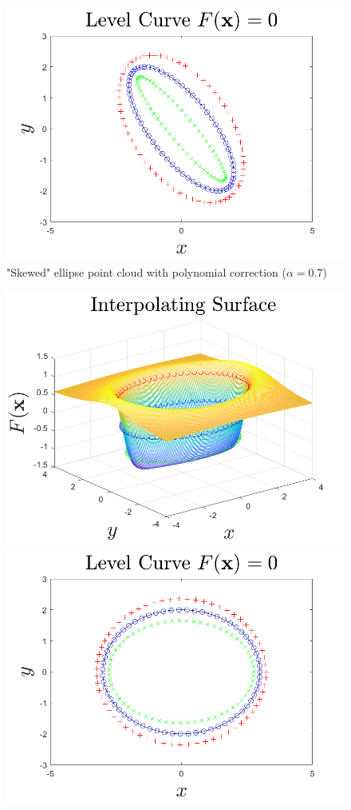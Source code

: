 \documentclass{article}
\begin{document}
\begin{itemize}
\begin{figure}[H]
        \includegraphics[scale = 0.35]{levelCurve_skewed_ploy.png}
        \centering
        \caption{"Skewed" ellipse point cloud with polynomial correction ($\alpha = 0.7$)}
    \end{figure}
    \begin{figure}[H]
        \includegraphics[scale = 0.35]{interpSurf_ellipse_poly.png}
        \includegraphics[scale = 0.35]{levelCurve_ellipse_poly.png}

\end{figure}
\end{itemize}
\end{document}
